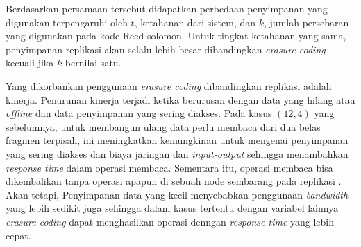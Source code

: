 Berdasarkan persamaan tersebut didapatkan perbedaan penyimpanan yang digunakan terpengaruhi oleh $t$, ketahanan dari sistem, dan $k$, jumlah persebaran yang digunakan pada kode Reed-solomon. Untuk tingkat ketahanan yang sama, penyimpanan replikasi akan selalu lebih besar dibandingkan \textit{erasure coding} kecuali jika $k$ bernilai satu.

Yang dikorbankan penggunaan \textit{erasure coding} dibandingkan replikasi adalah kinerja. Penurunan kinerja terjadi ketika berurusan dengan data yang hilang atau \textit{offline} dan data penyimpanan yang sering diakses. Pada kasus $(12, 4)$ yang sebelumnya, untuk membangun ulang data perlu membaca dari dua belas fragmen terpisah, ini meningkatkan kemungkinan untuk mengenai penyimpanan yang sering diakses dan biaya jaringan dan \textit{input-output} sehingga menambahkan \textit{response time} dalam operasi membaca. Sementara itu, operasi membaca bisa dikembalikan tanpa operasi apapun di sebuah node sembarang pada replikasi \parencite{huang2012erasure}. Akan tetapi, Penyimpanan data yang kecil menyebabkan penggunaan \textit{bandwidth} yang lebih sedikit juga sehingga dalam kasus tertentu dengan variabel lainnya \textit{erasure coding} dapat menghasilkan operasi denngan \textit{response time} yang lebih cepat.
